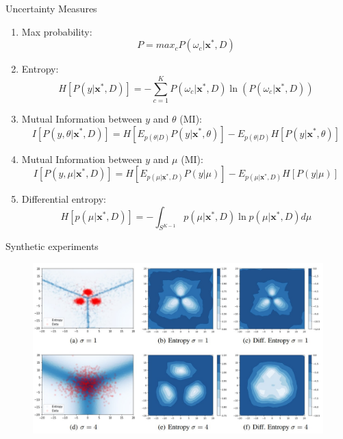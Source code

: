 \documentclass{beamer}
\begin{document}
\begin{frame}{Uncertainty Measures}

\begin{enumerate}
    \item Max probability:
        $$P = max_c P(\omega_c | \mathbf{x}^*, D)$$
    \item Entropy:
        $$H[P(y | \mathbf{x}^*, D)] = - \sum_{c=1}^KP(\omega_c | \mathbf{x}^*, D) \ln(P(\omega_c | \mathbf{x}^*, D))$$
    \item Mutual Information between $y$ and $\theta$ (MI):
         $$I[P(y, \theta | \mathbf{x}^*, D)] = H[E_{p(\theta|D)}P(y | \mathbf{x}^*, \theta)] - E_{p(\theta|D)}H[P(y | \mathbf{x}^*, \theta)]$$
    \item Mutual Information between $y$ and $\mu$ (MI):
        $$I[P(y, \mu | \mathbf{x}^*, D)] = H[E_{p(\mu|\mathbf{x}^*,D)}P(y | \mu)] - E_{p(\mu|\mathbf{x}^*,D)}H[P(y | \mu)]$$
    \item Differential entropy:
        $$H[p(\mu | \mathbf{x}^*, D)] = - \int_{S^{K-1}}p(\mu | \mathbf{x}^*, D) \ln p(\mu | \mathbf{x}^*, D)d\mu$$
\end{enumerate}
\end{frame}
\begin{frame}{Synthetic experiments}
    \begin{figure}[h]
        \includegraphics[scale=0.25]{results.jpg}
     \end{figure}
\end{frame}
\end{document}
